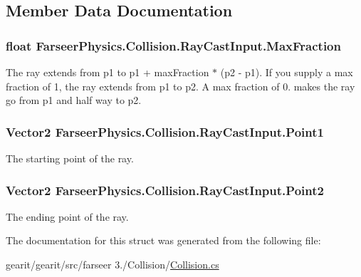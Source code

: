 \subsection{Member Data Documentation}
\hypertarget{struct_farseer_physics_1_1_collision_1_1_ray_cast_input_a9df5da3a4fb1c973944d5d0f00932e7e}{
\subsubsection[{Max\+Fraction}]{\setlength{\rightskip}{0pt plus 5cm}float Farseer\+Physics.\+Collision.\+Ray\+Cast\+Input.\+Max\+Fraction}}\label{struct_farseer_physics_1_1_collision_1_1_ray_cast_input_a9df5da3a4fb1c973944d5d0f00932e7e}


The ray extends from p1 to p1 + max\+Fraction $\ast$ (p2 -\/ p1). If you supply a max fraction of 1, the ray extends from p1 to p2. A max fraction of 0. makes the ray go from p1 and half way to p2. 

\hypertarget{struct_farseer_physics_1_1_collision_1_1_ray_cast_input_a083dcb06197b7e0d55051ebfbab6419e}{
\subsubsection[{Point1}]{\setlength{\rightskip}{0pt plus 5cm}Vector2 Farseer\+Physics.\+Collision.\+Ray\+Cast\+Input.\+Point1}}\label{struct_farseer_physics_1_1_collision_1_1_ray_cast_input_a083dcb06197b7e0d55051ebfbab6419e}


The starting point of the ray. 

\hypertarget{struct_farseer_physics_1_1_collision_1_1_ray_cast_input_ad6e8f0beb274e23949a9a9074799731f}{
\subsubsection[{Point2}]{\setlength{\rightskip}{0pt plus 5cm}Vector2 Farseer\+Physics.\+Collision.\+Ray\+Cast\+Input.\+Point2}}\label{struct_farseer_physics_1_1_collision_1_1_ray_cast_input_ad6e8f0beb274e23949a9a9074799731f}


The ending point of the ray. 



The documentation for this struct was generated from the following file\+:\begin{DoxyCompactItemize}
\item 
gearit/gearit/src/farseer 3./\+Collision/\hyperlink{_collision_8cs}{Collision.\+cs}\end{DoxyCompactItemize}
